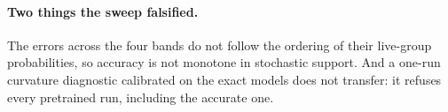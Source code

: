 \paragraph{Two things the sweep falsified.} The errors across the four bands do not follow the
ordering of their live-group probabilities, so accuracy is not monotone in stochastic support. And
a one-run curvature diagnostic calibrated on the exact models does not transfer: it refuses every
pretrained run, including the accurate one.
